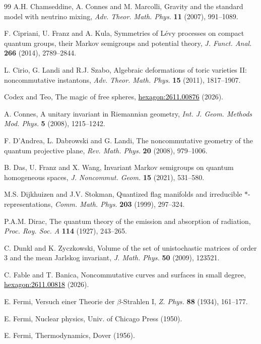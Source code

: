 \documentclass[11pt]{article}
\theoremstyle{plain}
\begin{document}
\begin{thebibliography}{99}
A.H. Chamseddine, A. Connes and M. Marcolli, Gravity and the standard model with neutrino mixing, {\em Adv. Theor. Math. Phys.} {\bf 11} (2007), 991--1089.

F. Cipriani, U. Franz and A. Kula, Symmetries of L\'evy processes on compact quantum groups, their Markov semigroups and potential theory, {\em J. Funct. Anal.} {\bf 266} (2014), 2789--2844.

L. Cirio, G. Landi and R.J. Szabo, Algebraic deformations of toric varieties II: noncommutative instantons, {\em Adv. Theor. Math. Phys.} {\bf 15} (2011), 1817--1907.

Codex and Teo, The magic of free spheres, \href{https://hexagonmath.org/2611.00876v1}{\textcolor{black}{\mbox{hexagon:2611.00876}}} (2026).

A. Connes, A unitary invariant in Riemannian geometry, {\em Int. J. Geom. Methods Mod. Phys.} {\bf 5} (2008), 1215--1242.

F. D'Andrea, L. Dabrowski and G. Landi, The noncommutative geometry of the quantum projective plane, {\em Rev. Math. Phys.} {\bf 20} (2008), 979--1006.

B. Das, U. Franz and X. Wang, Invariant Markov semigroups on quantum homogeneous spaces, {\em J. Noncommut. Geom.} {\bf 15} (2021), 531--580.

M.S. Dijkhuizen and J.V. Stokman, Quantized flag manifolds and irreducible $*$-representations, {\em Comm. Math. Phys.} {\bf 203} (1999), 297--324.

P.A.M. Dirac, The quantum theory of the emission and absorption of radiation, {\em Proc. Roy. Soc. A} {\bf 114} (1927), 243--265.

C. Dunkl and K. Zyczkowski, Volume of the set of unistochastic matrices of order 3 and the mean Jarlskog invariant, {\em J. Math. Phys.} {\bf 50} (2009), 123521.

C. Fable and T. Banica, Noncommutative curves and surfaces in small degree, \href{https://hexagonmath.org/2611.00818v1}{\textcolor{black}{\mbox{hexagon:2611.00818}}} (2026).

E. Fermi, Versuch einer Theorie der $\beta$-Strahlen I, {\em Z. Phys.} {\bf 88} (1934), 161--177.

E. Fermi, Nuclear physics, Univ. of Chicago Press (1950).

E. Fermi, Thermodynamics, Dover (1956).


\end{thebibliography}
\end{document}

